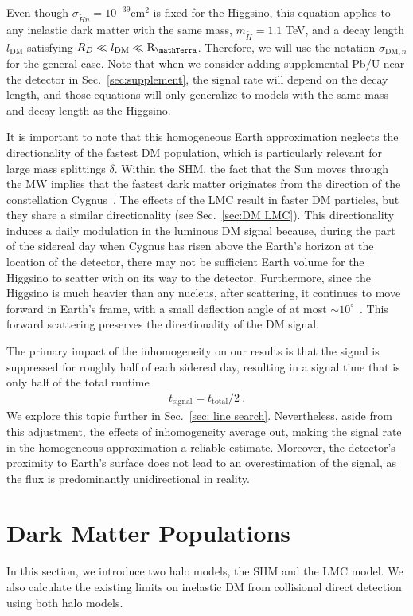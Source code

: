 \documentclass[aps,prd,amsmath,amssymb,10pt,letterpaper,balancelastpage,showpacs,superscriptaddress,nofootinbib,floatfix,notitlepage,longbibliography,twocolumn
]{revtex4-2}
\newcommand{\sxN}{\sigma_{\Ht n}}
\newcommand{\mx}{m_{\Ht}}
\newcommand{\REarth}{\mathrm{R}_{\mathTerra}}
\newcommand{\ttotal}{t_{\text{total}}}
\newcommand{\tsignal}{t_{\text{signal}}}
\newcommand{\Ht}{\tilde{H}}
\begin{document}
Even though $\sxN=10^{-39} \textrm{cm}^2$ is fixed for the Higgsino, this equation applies to any inelastic dark matter with the same mass, $\mx=1.1$ TeV, and a decay length $l_{\text{DM}}$ satisfying $R_D \ll l_{\text{DM}} \ll \REarth$. Therefore, we will use the notation $\sigma_{\text{DM},n}$ for the general case. Note that when we consider adding supplemental Pb/U near the detector in Sec.~\ref{sec:supplement}, the signal rate will depend on the decay length, and those equations will only generalize to models with the same mass and decay length as the Higgsino.

It is important to note that this homogeneous Earth approximation neglects the directionality of the fastest DM population, which is particularly relevant for large mass splittings $\delta$. Within the SHM, the fact that the Sun moves through the MW implies that the fastest dark matter originates from the direction of the constellation Cygnus~\cite{Directional_DM, Luminous}. The effects of the LMC result in faster DM particles, but they share a similar directionality (see Sec.~\ref{sec:DM LMC}). This directionality induces a daily modulation in the luminous DM signal because, during the part of the sidereal day when Cygnus has risen above the Earth's horizon at the location of the detector, there may not be sufficient Earth volume for the Higgsino to scatter with on its way to the detector. Furthermore, since the Higgsino is much heavier than any nucleus, after scattering, it continues to move forward in Earth’s frame, with a small deflection angle of at most $\sim 10^{\circ}$~\cite{Luminous}. This forward scattering preserves the directionality of the DM signal. 

The primary impact of the inhomogeneity on our results is that the signal is suppressed for roughly half of each sidereal day, resulting in a signal time that is only half of the total runtime
\begin{align} \label{eq:signal time half}
    \tsignal = \ttotal/2 ~.
\end{align}
We explore this topic further in Sec.~\ref{sec: line search}. Nevertheless, aside from this adjustment, the effects of inhomogeneity average out, making the signal rate in the homogeneous approximation a reliable estimate. Moreover, the detector’s proximity to Earth’s surface does not lead to an overestimation of the signal, as the flux is predominantly unidirectional in reality.

\section{Dark Matter Populations\label{sec:DM populations}}
In this section, we introduce two halo models, the SHM and the LMC model. We also calculate the existing limits on inelastic DM from collisional direct detection using both halo models.
\end{document}
